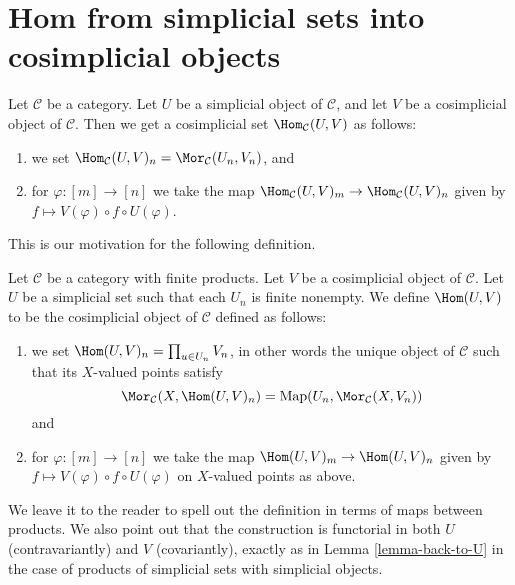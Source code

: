 \section{Hom from simplicial sets into cosimplicial objects}
\label{section-hom-from-simplicial-sets-into-cosimplicial}

\noindent
Let $\mathcal{C}$ be a category.
Let $U$ be a simplicial object of $\mathcal{C}$,
and let $V$ be a cosimplicial object of $\mathcal{C}$.
Then we get a cosimplicial set $\Hom_\mathcal{C}(U, V)$
as follows:
\begin{enumerate}
\item we set
$\Hom_\mathcal{C}(U, V)_n = \Mor_\mathcal{C}(U_n, V_n)$, and
\item for $\varphi : [m] \to [n]$ we take the map
$\Hom_\mathcal{C}(U, V)_m \to \Hom_\mathcal{C}(U, V)_n$
given by $f \mapsto V(\varphi) \circ f \circ U(\varphi)$.
\end{enumerate}
This is our motivation for the following definition.

\begin{definition}
\label{definition-hom-deltak-cosimplicial}
Let $\mathcal{C}$ be a category with finite products.
Let $V$ be a cosimplicial object of $\mathcal{C}$.
Let $U$ be a simplicial set such that each
$U_n$ is finite nonempty.
We define {\it $\Hom(U, V)$} to be
the cosimplicial object of $\mathcal{C}$ defined
as follows:
\begin{enumerate}
\item we set $\Hom(U, V)_n = \prod_{u \in U_n} V_n$,
in other words the unique object of $\mathcal{C}$ such
that its $X$-valued points satisfy
$$
\Mor_\mathcal{C}(X, \Hom(U, V)_n)
=
\text{Map}(U_n, \Mor_\mathcal{C}(X, V_n))
$$
and
\item for $\varphi : [m] \to [n]$ we take the map
$\Hom(U, V)_m \to \Hom(U, V)_n$
given by $f \mapsto V(\varphi) \circ f \circ U(\varphi)$
on $X$-valued points as above.
\end{enumerate}
\end{definition}

\noindent
We leave it to the reader to spell out the
definition in terms of maps between products.
We also point out that the construction is functorial
in both $U$ (contravariantly) and $V$ (covariantly), exactly as in
Lemma \ref{lemma-back-to-U} in the case of
products of simplicial sets with simplicial objects.









